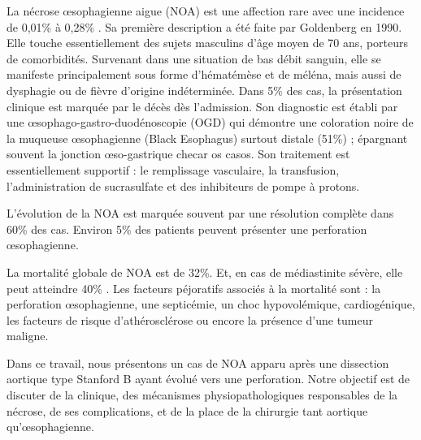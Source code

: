 \documentclass[./tfe.tex]{subfiles}
\begin{document}
La nécrose œsophagienne aigue (NOA) est une affection rare avec une incidence de 0,01\% à 0,28\% \cite{gurvits_acute_2007}. Sa première description a été faite par Goldenberg en 1990\cite{gurvits_acute_2007}. Elle touche essentiellement des sujets masculins d’âge moyen de 70 ans, porteurs de comorbidités. Survenant dans une situation de bas débit sanguin, elle se manifeste principalement sous forme d'hématémèse et de méléna, mais aussi de dysphagie ou de fièvre d'origine indéterminée. Dans 5\% des cas, la présentation clinique est marquée par le décès dès l’admission\cite{abdullah_clinical_2019}. Son diagnostic est établi par une œsophago-gastro-duodénoscopie (OGD) qui démontre une coloration noire de la muqueuse œsophagienne (Black Esophagus) surtout distale (51\%) ; épargnant souvent la jonction œso-gastrique \cite{abdullah_clinical_2019, park_ischemic_2004} checar os casos. Son traitement est essentiellement supportif : le remplissage vasculaire, la transfusion, l’administration de sucrasulfate et des inhibiteurs de pompe à protons.

L’évolution de la NOA est marquée souvent par une résolution complète dans 60\% des cas. Environ 5\% des patients peuvent présenter une perforation œsophagienne\cite{abdullah_clinical_2019}.

La mortalité globale de NOA est de 32\%\cite{abdullah_clinical_2019}. Et, en cas de médiastinite sévère, elle peut atteindre 40\% \cite{gurvits_acute_2007}. Les facteurs péjoratifs associés à la mortalité sont : la perforation œsophagienne, une septicémie, un choc hypovolémique, cardiogénique, les facteurs de risque d’athérosclérose ou encore la présence d’une tumeur maligne.

Dans ce travail, nous présentons un cas de NOA apparu après une dissection aortique type Stanford B ayant évolué vers une perforation. Notre objectif est de discuter de la clinique, des mécanismes physiopathologiques responsables de la nécrose, de ses complications, et de la place de la chirurgie tant aortique qu’œsophagienne.
\end{document}

